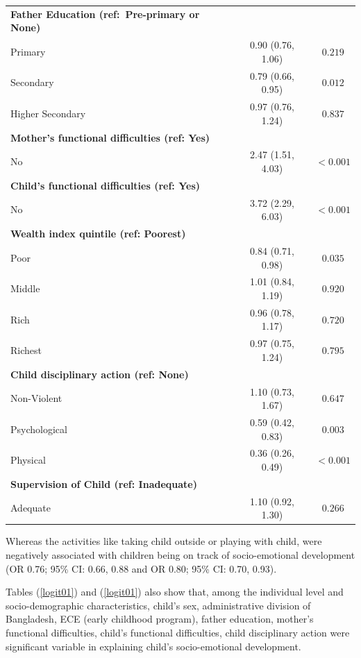 \documentclass[
  12pt,
  oneside]{report}
\begin{document}
\begin{longtable}{lcc}
\textbf{Father Education (ref:~Pre-primary or None)} & \multicolumn{1}{l}{} & \multicolumn{1}{l}{} \\
Primary & 0.90 (0.76, 1.06) & $0.219$ \\
Secondary & 0.79 (0.66, 0.95) & $0.012$ \\
Higher Secondary & 0.97 (0.76, 1.24) & $0.837$ \\
\textbf{Mother's functional difficulties (ref: Yes)} & \multicolumn{1}{l}{} & \multicolumn{1}{l}{} \\
No & 2.47 (1.51, 4.03) & $<0.001$ \\
\textbf{Child's functional difficulties (ref: Yes)} & \multicolumn{1}{l}{} & \multicolumn{1}{l}{} \\
No & 3.72 (2.29, 6.03) & $<0.001$ \\
\textbf{Wealth index quintile (ref: Poorest)} & \multicolumn{1}{l}{} & \multicolumn{1}{l}{} \\
Poor & 0.84 (0.71, 0.98) & $0.035$ \\
Middle & 1.01 (0.84, 1.19) & $0.920$ \\
Rich & 0.96 (0.78, 1.17) & $0.720$ \\
Richest & 0.97 (0.75, 1.24) & $0.795$ \\
\textbf{Child disciplinary action (ref: None)} & \multicolumn{1}{l}{} & \multicolumn{1}{l}{} \\
Non-Violent & 1.10 (0.73, 1.67) & $0.647$ \\
Psychological & 0.59 (0.42, 0.83) & $0.003$ \\
Physical & 0.36 (0.26, 0.49) & $<0.001$ \\
\textbf{Supervision of Child (ref: Inadequate)} & \multicolumn{1}{l}{} & \multicolumn{1}{l}{} \\
Adequate & 1.10 (0.92, 1.30) & $0.266$ \\
\bottomrule
\end{longtable}

\normalsize

\vspace{14mm}

Whereas the activities like taking child outside or playing with child, were negatively associated with children being on track of socio-emotional development (OR 0.76; 95\% CI: 0.66, 0.88 and OR 0.80; 95\% CI: 0.70, 0.93).

Tables (\ref{logit01}) and (\ref{logit01}) also show that, among the individual level and socio-demographic characteristics, child's sex, administrative division of Bangladesh, ECE (early childhood program), father education, mother's functional difficulties, child's functional difficulties, child disciplinary action were significant variable in explaining child's socio-emotional development.
\end{document}
